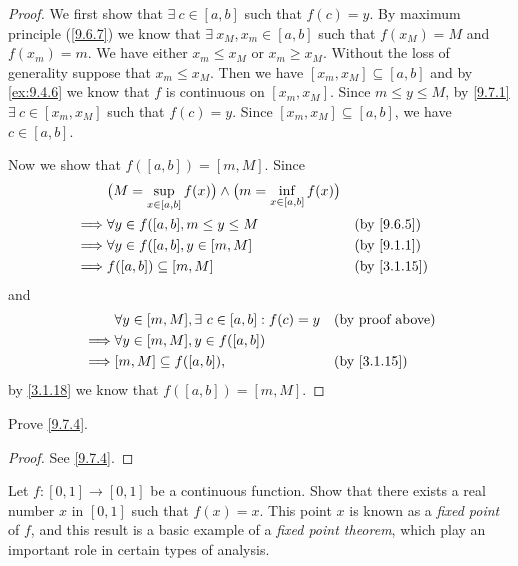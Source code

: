 \begin{proof}
  We first show that \(\exists\ c \in [a, b]\) such that \(f(c) = y\).
  By maximum principle (\cref{9.6.7}) we know that \(\exists\ x_M, x_m \in [a, b]\) such that \(f(x_M) = M\) and \(f(x_m) = m\).
  We have either \(x_m \leq x_M\) or \(x_m \geq x_M\).
  Without the loss of generality suppose that \(x_m \leq x_M\).
  Then we have \([x_m, x_M] \subseteq [a, b]\) and by \cref{ex:9.4.6} we know that \(f\) is continuous on \([x_m, x_M]\).
  Since \(m \leq y \leq M\), by \cref{9.7.1} \(\exists\ c \in [x_m, x_M]\) such that \(f(c) = y\).
  Since \([x_m, x_M] \subseteq [a, b]\), we have \(c \in [a, b]\).

  Now we show that \(f([a, b]) = [m, M]\).
  Since
  \begin{align*}
             & \big(M = \sup_{x \in [a, b]} f(x)\big) \land \big(m = \inf_{x \in [a, b]} f(x)\big)                                \\
    \implies & \forall y \in f([a, b], m \leq y \leq M                                             &  & \by{9.6.5}                \\
    \implies & \forall y \in f([a, b], y \in [m, M]                                                &  & \by{9.1.1}                \\
    \implies & f([a, b]) \subseteq [m, M]                                                          &  & \text{(by \cref{3.1.15})}
  \end{align*}
  and
  \begin{align*}
             & \forall y \in [m, M], \exists\ c \in [a, b] : f(c) = y &  & \text{(by proof above)}   \\
    \implies & \forall y \in [m, M], y \in f([a, b])                                                 \\
    \implies & [m, M] \subseteq f([a, b]),                            &  & \text{(by \cref{3.1.15})}
  \end{align*}
  by \cref{3.1.18} we know that \(f([a, b]) = [m ,M]\).
\end{proof}

\exercisesection

\begin{ex}\label{ex:9.7.1}
  Prove \cref{9.7.4}.
\end{ex}

\begin{proof}
  See \cref{9.7.4}.
\end{proof}

\begin{ex}\label{ex:9.7.2}
  Let \(f : [0, 1] \to [0, 1]\) be a continuous function.
  Show that there exists a real number \(x\) in \([0, 1]\) such that \(f(x) = x\).
  This point \(x\) is known as a \emph{fixed point} of \(f\), and this result is a basic example of a \emph{fixed point theorem}, which play an important role in certain types of analysis.
\end{ex}

